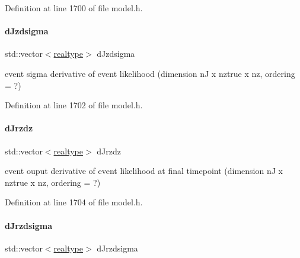 Definition at line 1700 of file model.\+h.

\mbox{\label{classamici_1_1_model_adb1036c3ad16c2b4c48b71452eab63c7}} 
\paragraph{\texorpdfstring{d\+Jzdsigma}{dJzdsigma}}
{\footnotesize\ttfamily std\+::vector$<$\mbox{\hyperlink{namespaceamici_a1bdce28051d6a53868f7ccbf5f2c14a3}{realtype}}$>$ d\+Jzdsigma\hspace{0.3cm}{\ttfamily [protected]}}

event sigma derivative of event likelihood (dimension nJ x nztrue x nz, ordering = ?) 

Definition at line 1702 of file model.\+h.

\mbox{\label{classamici_1_1_model_a80eade42075bbd373d5531c6fd7cd877}} 
\paragraph{\texorpdfstring{d\+Jrzdz}{dJrzdz}}
{\footnotesize\ttfamily std\+::vector$<$\mbox{\hyperlink{namespaceamici_a1bdce28051d6a53868f7ccbf5f2c14a3}{realtype}}$>$ d\+Jrzdz\hspace{0.3cm}{\ttfamily [protected]}}

event ouput derivative of event likelihood at final timepoint (dimension nJ x nztrue x nz, ordering = ?) 

Definition at line 1704 of file model.\+h.

\mbox{\label{classamici_1_1_model_ad38f72dc10596ffb60d0472dc4b7eade}} 
\paragraph{\texorpdfstring{d\+Jrzdsigma}{dJrzdsigma}}
{\footnotesize\ttfamily std\+::vector$<$\mbox{\hyperlink{namespaceamici_a1bdce28051d6a53868f7ccbf5f2c14a3}{realtype}}$>$ d\+Jrzdsigma\hspace{0.3cm}{\ttfamily [protected]}}

